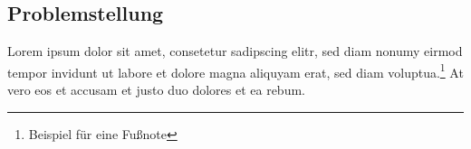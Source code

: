\subsection{Problemstellung}\label{Problemstellung}

Lorem ipsum dolor sit amet, consetetur sadipscing elitr, sed diam nonumy eirmod tempor invidunt ut labore et dolore magna aliquyam erat, sed diam voluptua.\footnote{Beispiel für eine Fußnote}
 At vero eos et accusam et justo duo dolores et ea rebum.